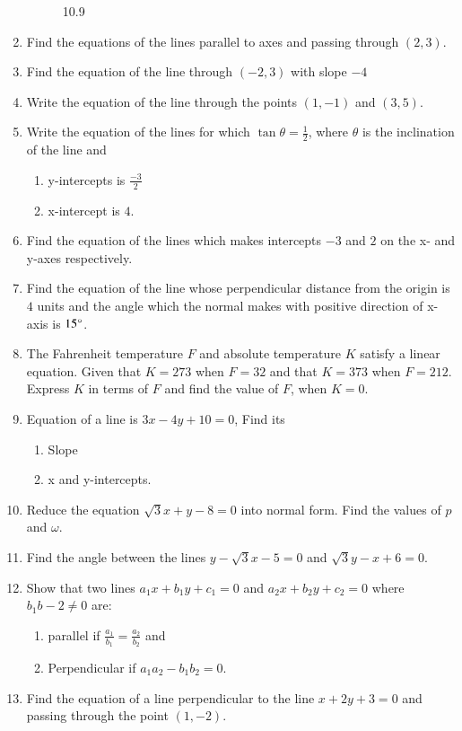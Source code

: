 \documentclass{article}
\theoremstyle{remark}
\begin{document}
\begin{enumerate}
\begin{figure}[h]
\caption{10.9}
  \label{fig:10.9}
\end{figure}
\item Find the equations of the lines parallel to axes and passing through $(2,3)$.
\item Find the equation of the line through $(-2,3)$ with slope $-4$
\item Write the equation of the line through the points $(1,-1)$ and $(3,5)$.
\item Write the equation of the lines for which $\tan \theta=\frac{1}{2}$, where $\theta$ is the inclination of the line and
\begin{enumerate}[label=(\roman*)]
\item  y-intercepts is $\frac{-3}{2}$ 
\item  x-intercept is $4$.
\end{enumerate}
\item Find the equation of the lines which makes intercepts $-3$ and $2$ on the x- and y-axes respectively.
\item Find the equation of the line whose perpendicular distance from the origin is $4$ units and the angle which the normal makes with positive direction of x-axis is $15\degree$.
\item The Fahrenheit temperature $F$ and  absolute temperature $K$ satisfy a linear equation. Given that $K=273$ when $F=32$ and that $K=373$ when $F=212$. Express $K$ in terms of $F$ and find the value of $F$, when $K=0$.
\item Equation of a line is $3x-4y+10=0$, Find its
\begin{enumerate}[label=(\roman*)]
\item  Slope
\item  x and y-intercepts.
\end{enumerate}
\item Reduce the equation $\sqrt3x+y-8=0$ into normal form. Find the values of $p$ and $\omega$.
\item Find the angle between the lines $y-\sqrt 3x-5=0$ and $\sqrt 3y-x+6=0$.
\item Show that two lines $a_1x+b_1y+c_1=0$ and $a_2x+b_2y+c_2=0$ where $b_1b-2\neq 0$ are:
\begin{enumerate}
\item parallel if $\frac{a_1}{b_1}=\frac{a_2}{b_2}$ and 
\item Perpendicular if $a_1a_2-b_1b_2=0$.
\end {enumerate}
\item Find the equation of a line perpendicular to the line $x+2y+3=0$ and passing through the point $(1,-2)$.

\end{enumerate}
\end{document}
